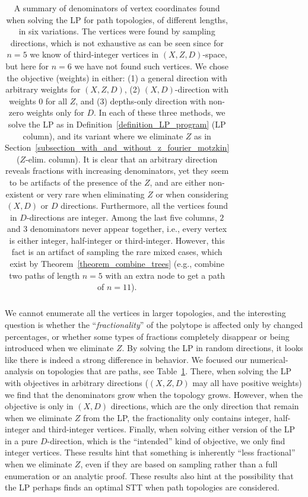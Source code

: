 \begin{table}[!ht]
\begin{center}
\begin{tabular}{|c|l|l||l|l||c|c|}
    \hline
    \end{tabular}
    \end{center}
    \caption{\footnotesize{A summary of denominators of vertex coordinates found when solving the LP for path topologies, of different lengths, in six variations. The vertices were found by sampling directions, which is not exhaustive as can be seen since for $n=5$ we know of third-integer vertices in $(X,Z,D)$-space, but here for $n=6$ we have not found such vertices. We chose the objective (weights) in either: (1) a general direction with arbitrary weights for $(X,Z,D)$, (2) $(X,D)$-direction with weights $0$ for all $Z$, and (3) depths-only direction with non-zero weights only for $D$. In each of these three methods, we solve the LP as in Definition~\ref{definition_LP_program} (LP column), and its variant where we eliminate $Z$ as in Section~\ref{subsection_with_and_without_z_fourier_motzkin} ($Z$-elim. column). It is clear that an arbitrary direction reveals fractions with increasing denominators, yet they seem to be artifacts of the presence of the $Z$, and are either non-existent or very rare when eliminating $Z$ or when considering $(X,D)$ or $D$ directions. Furthermore, all the vertices found in $D$-directions are integer. Among the last five columns, $2$ and $3$ denominators never appear together, i.e., every vertex is either integer, half-integer or third-integer. However, this fact is an artifact of sampling the rare mixed cases, which exist by Theorem~\ref{theorem_combine_trees} (e.g., combine two paths of length $n=5$ with an extra node to get a path of $n=11$).}}
    \label{table_path_tree_fractions}
\end{table}

We cannot enumerate all the vertices in larger topologies, and the interesting question is whether the ``\emph{fractionality}'' of the polytope is affected only by changed percentages, or whether some types of fractions completely disappear or being introduced when we eliminate $Z$. By solving the LP in random directions, it looks like there is indeed a strong difference in behavior. We focused our numerical-analysis on topologies that are paths, see Table~\ref{table_path_tree_fractions}. There, when solving the LP with objectives in arbitrary directions ($(X,Z,D)$ may all have positive weights) we find that the denominators grow when the topology grows. However, when the objective is only in $(X,D)$ directions, 
which are the only direction that remain when
we eliminate $Z$ from the LP, the fractionality only contains integer, half-integer and third-integer vertices. Finally, when solving either version of the LP in a pure $D$-direction, which is the ``intended'' kind of objective, we only find integer vertices. These results hint that something is inherently ``less fractional'' when we eliminate $Z$, even if they are based on sampling rather than a full enumeration or an analytic proof. These results also hint at the possibility that the LP perhaps finds an optimal STT when path topologies are considered.


